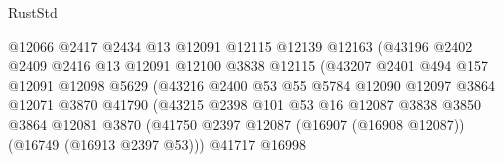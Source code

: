 \begin{lexlean}{RustStd}
\begin{coremodule}
                                      @12066
                                      @2417
                                      @2434
                                      @13
                                      @12091
                                      @12115
                                      @12139
                                      @12163
                                      (@43196
                                        @2402
                                        @2409
                                        @2416
                                        @13
                                        @12091
                                        @12100
                                        @3838
                                        @12115
                                        (@43207
                                          @2401
                                          @494
                                          @157
                                          @12091
                                          @12098
                                          @5629
                                          (@43216
                                            @2400
                                            @53
                                            @55
                                            @5784
                                            @12090
                                            @12097
                                            @3864
                                            @12071
                                            @3870
                                            @41790
                                            (@43215
                                              @2398
                                              @101
                                              @53
                                              @16
                                              @12087
                                              @3838
                                              @3850
                                              @3864
                                              @12081
                                              @3870
                                              (@41750
                                                @2397
                                                @12087
                                                (@16907 (@16908 @12087))
                                                (@16749 (@16913 @2397 @53)))
                                              @41717
                                              @16998

\end{coremodule}
\end{lexlean}
